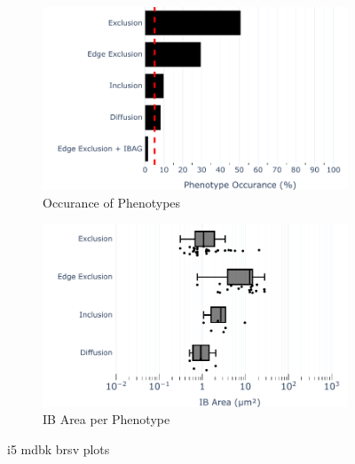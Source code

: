 \begin{figure}
    \begin{subfigure}{0.5\textwidth}
        \includegraphics[width=1\linewidth]{09. Chapter 4/Figs/02. Infection/03. IFIT5/07. bar_i5_mdbk.pdf} 
        \caption[]{Occurance of Phenotypes}
    \end{subfigure}
    \begin{subfigure}{0.5\textwidth}
        \includegraphics[width=1\linewidth]{09. Chapter 4/Figs/02. Infection/03. IFIT5/08. box_i5_mdbk.pdf}
        \caption[]{IB Area per Phenotype}
    \end{subfigure}
    \caption[i5 mdbk brsv plots]{i5 mdbk brsv plots}
    \label{fig:i5 mdbk brsv plots}
\end{figure}

